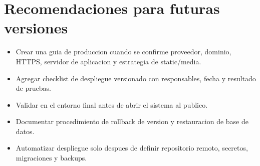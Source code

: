 \section{Recomendaciones para futuras versiones}
\label{sec:despliegue-recomendaciones}

\begin{itemize}
  \item Crear una guia de produccion cuando se confirme proveedor, dominio, HTTPS, servidor de aplicacion y estrategia de static/media.
  \item Agregar checklist de despliegue versionado con responsables, fecha y resultado de pruebas.
  \item Validar  en el entorno final antes de abrir el sistema al publico.
  \item Documentar procedimiento de rollback de version y restauracion de base de datos.
  \item Automatizar despliegue solo despues de definir repositorio remoto, secretos, migraciones y backups.
\end{itemize}
